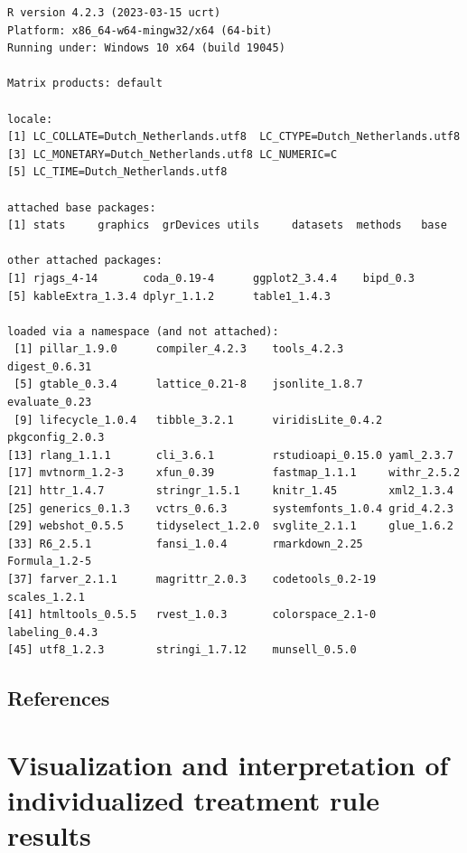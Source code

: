 \documentclass[
  letterpaper,
  DIV=11,
  numbers=noendperiod]{scrreprt}
\begin{document}
\begin{verbatim}
R version 4.2.3 (2023-03-15 ucrt)
Platform: x86_64-w64-mingw32/x64 (64-bit)
Running under: Windows 10 x64 (build 19045)

Matrix products: default

locale:
[1] LC_COLLATE=Dutch_Netherlands.utf8  LC_CTYPE=Dutch_Netherlands.utf8   
[3] LC_MONETARY=Dutch_Netherlands.utf8 LC_NUMERIC=C                      
[5] LC_TIME=Dutch_Netherlands.utf8    

attached base packages:
[1] stats     graphics  grDevices utils     datasets  methods   base     

other attached packages:
[1] rjags_4-14       coda_0.19-4      ggplot2_3.4.4    bipd_0.3        
[5] kableExtra_1.3.4 dplyr_1.1.2      table1_1.4.3    

loaded via a namespace (and not attached):
 [1] pillar_1.9.0      compiler_4.2.3    tools_4.2.3       digest_0.6.31    
 [5] gtable_0.3.4      lattice_0.21-8    jsonlite_1.8.7    evaluate_0.23    
 [9] lifecycle_1.0.4   tibble_3.2.1      viridisLite_0.4.2 pkgconfig_2.0.3  
[13] rlang_1.1.1       cli_3.6.1         rstudioapi_0.15.0 yaml_2.3.7       
[17] mvtnorm_1.2-3     xfun_0.39         fastmap_1.1.1     withr_2.5.2      
[21] httr_1.4.7        stringr_1.5.1     knitr_1.45        xml2_1.3.4       
[25] generics_0.1.3    vctrs_0.6.3       systemfonts_1.0.4 grid_4.2.3       
[29] webshot_0.5.5     tidyselect_1.2.0  svglite_2.1.1     glue_1.6.2       
[33] R6_2.5.1          fansi_1.0.4       rmarkdown_2.25    Formula_1.2-5    
[37] farver_2.1.1      magrittr_2.0.3    codetools_0.2-19  scales_1.2.1     
[41] htmltools_0.5.5   rvest_1.0.3       colorspace_2.1-0  labeling_0.4.3   
[45] utf8_1.2.3        stringi_1.7.12    munsell_0.5.0    
\end{verbatim}

\hypertarget{references-5}{%
\section*{References}\label{references-5}}



\hypertarget{visualization-and-interpretation-of-individualized-treatment-rule-results}{%
\chapter{Visualization and interpretation of individualized treatment
rule
results}\label{visualization-and-interpretation-of-individualized-treatment-rule-results}}
\end{document}
